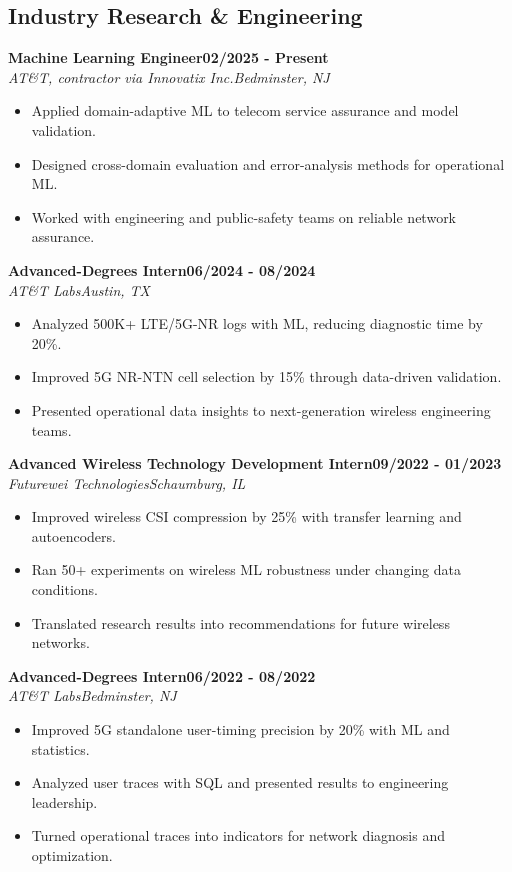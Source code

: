 \documentclass[9pt,letterpaper]{extarticle}
\newcommand{\role}[4]{%
  \Needspace{4\baselineskip}\textbf{#1}\hfill\textbf{#2}\\[-1pt]
  \textit{#3}\hfill\textit{#4}\par}
\begin{document}
\subsection{Industry Research \& Engineering}
\role{Machine Learning Engineer}{02/2025 - Present}{AT\&T, contractor via Innovatix Inc.}{Bedminster, NJ}
\begin{itemize}
\item Applied domain-adaptive ML to telecom service assurance and model validation.
\item Designed cross-domain evaluation and error-analysis methods for operational ML.
\item Worked with engineering and public-safety teams on reliable network assurance.
\end{itemize}
\vspace{1pt}
\role{Advanced-Degrees Intern}{06/2024 - 08/2024}{AT\&T Labs}{Austin, TX}
\begin{itemize}
\item Analyzed 500K+ LTE/5G-NR logs with ML, reducing diagnostic time by 20\%.
\item Improved 5G NR-NTN cell selection by 15\% through data-driven validation.
\item Presented operational data insights to next-generation wireless engineering teams.
\end{itemize}
\vspace{1pt}
\role{Advanced Wireless Technology Development Intern}{09/2022 - 01/2023}{Futurewei Technologies}{Schaumburg, IL}
\begin{itemize}
\item Improved wireless CSI compression by 25\% with transfer learning and autoencoders.
\item Ran 50+ experiments on wireless ML robustness under changing data conditions.
\item Translated research results into recommendations for future wireless networks.
\end{itemize}
\vspace{1pt}
\role{Advanced-Degrees Intern}{06/2022 - 08/2022}{AT\&T Labs}{Bedminster, NJ}
\begin{itemize}
\item Improved 5G standalone user-timing precision by 20\% with ML and statistics.
\item Analyzed user traces with SQL and presented results to engineering leadership.
\item Turned operational traces into indicators for network diagnosis and optimization.
\end{itemize}
\vspace{1pt}
\end{document}
